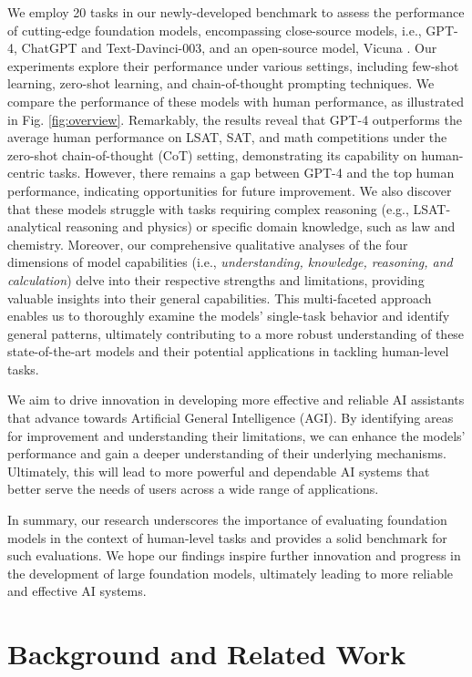 We employ 20 tasks in our newly-developed benchmark to assess the performance of cutting-edge foundation models, encompassing close-source models, i.e., GPT-4, ChatGPT and Text-Davinci-003, and an open-source model, Vicuna \citep{vicuna2023}. Our experiments explore their performance under various settings, including few-shot learning, zero-shot learning, and chain-of-thought prompting techniques. We compare the performance of these models with human performance, as illustrated in Fig. \ref{fig:overview}. 
Remarkably, the results reveal that GPT-4 outperforms the average human performance on LSAT, SAT, and math competitions under the zero-shot chain-of-thought (CoT) setting, demonstrating its capability on human-centric tasks. However, there remains a gap between GPT-4 and the top human performance, indicating opportunities for future improvement. We also discover that these models struggle with tasks requiring complex reasoning (e.g., LSAT-analytical reasoning and physics) or specific domain knowledge, such as law and chemistry. Moreover, our comprehensive qualitative analyses of the four dimensions of model capabilities (i.e., \textit{understanding, knowledge, reasoning, and calculation}) delve into their respective strengths and limitations, providing valuable insights into their general capabilities. This multi-faceted approach enables us to thoroughly examine the models' single-task behavior and identify general patterns, ultimately contributing to a more robust understanding of these state-of-the-art models and their potential applications in tackling human-level tasks.

We aim to drive innovation in developing more effective and reliable AI assistants that advance towards Artificial General Intelligence (AGI). By identifying areas for improvement and understanding their limitations, we can enhance the models' performance and gain a deeper understanding of their underlying mechanisms. Ultimately, this will lead to more powerful and dependable AI systems that better serve the needs of users across a wide range of applications. 

In summary, our research underscores the importance of evaluating foundation models in the context of human-level tasks and provides a solid benchmark for such evaluations. We hope our findings inspire further innovation and progress in the development of large foundation models, ultimately leading to more reliable and effective AI systems.

\section{Background and Related Work}
